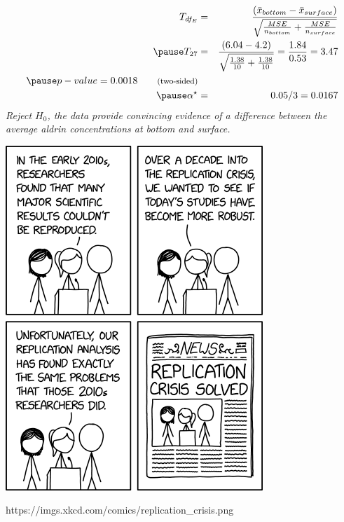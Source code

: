 \documentclass[slidestop,compress,mathserif]{beamer}
\newcommand{\soln}[1]{\textit{#1}}
\begin{document}
\begin{frame}
\frametitle{}


\pause

\soln{
\begin{eqnarray*}
T_{df_E} &=& \frac{(\bar{x}_{bottom} - \bar{x}_{surface})}{\sqrt{ \frac{MSE}{n_{bottom}} + \frac{MSE}{n_{surface}} }} \\ 
\pause
T_{27} &=& \frac{( 6.04 - 4.2 )}{\sqrt{ \frac{1.38}{10} + \frac{1.38}{10} }} = \frac{1.84}{0.53}  =3.47 \\
\pause
p-value = 0.0018 \qquad \text{{\footnotesize (two-sided)}} \\
\pause
\alpha^\star &=& 0.05 / 3 = 0.0167
\end{eqnarray*}
\pause
{\small Reject $H_0$, the data provide convincing evidence of a difference between the average aldrin concentrations at bottom and surface.}
}

\end{frame}


\begin{frame}
\begin{center}
\includegraphics[height=0.95\textheight]{xkcd_replication_crisis.png}
\end{center}

\footnotesize https://imgs.xkcd.com/comics/replication\_crisis.png
\end{frame}




\end{document}
